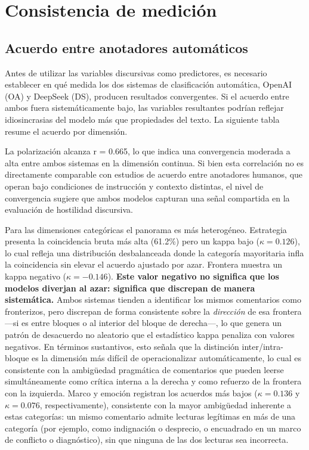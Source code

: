 \documentclass[
  letterpaper,
  numbers=noendperiod,
  fontsize=11pt,
  DIV=12,
  titlepage=false]{scrreprt}
\begin{document}
\section{Consistencia de medición}\label{consistencia-de-mediciuxf3n}

\subsection{Acuerdo entre anotadores
automáticos}\label{acuerdo-entre-anotadores-automuxe1ticos}

Antes de utilizar las variables discursivas como predictores, es
necesario establecer en qué medida los dos sistemas de clasificación
automática, OpenAI (OA) y DeepSeek (DS), producen resultados
convergentes. Si el acuerdo entre ambos fuera sistemáticamente bajo, las
variables resultantes podrían reflejar idiosincrasias del modelo más que
propiedades del texto. La siguiente tabla resume el acuerdo por
dimensión.

La polarización alcanza r = 0.665, lo que indica una convergencia
moderada a alta entre ambos sistemas en la dimensión continua. Si bien
esta correlación no es directamente comparable con estudios de acuerdo
entre anotadores humanos, que operan bajo condiciones de instrucción y
contexto distintas, el nivel de convergencia sugiere que ambos modelos
capturan una señal compartida en la evaluación de hostilidad discursiva.

Para las dimensiones categóricas el panorama es más heterogéneo.
Estrategia presenta la coincidencia bruta más alta (61.2\%) pero un
kappa bajo (\(\kappa = 0.126\)), lo cual refleja una distribución
desbalanceada donde la categoría mayoritaria infla la coincidencia sin
elevar el acuerdo ajustado por azar. Frontera muestra un kappa negativo
(\(\kappa = -0.146\)). \textbf{Este valor negativo no significa que los
modelos diverjan al azar: significa que discrepan de manera
sistemática.} Ambos sistemas tienden a identificar los mismos
comentarios como fronterizos, pero discrepan de forma consistente sobre
la \emph{dirección} de esa frontera ---si es entre bloques o al interior
del bloque de derecha---, lo que genera un patrón de desacuerdo no
aleatorio que el estadístico kappa penaliza con valores negativos. En
términos sustantivos, esto señala que la distinción inter/intra-bloque
es la dimensión más difícil de operacionalizar automáticamente, lo cual
es consistente con la ambigüedad pragmática de comentarios que pueden
leerse simultáneamente como crítica interna a la derecha y como refuerzo
de la frontera con la izquierda. Marco y emoción registran los acuerdos
más bajos (\(\kappa = 0.136\) y \(\kappa = 0.076\), respectivamente),
consistente con la mayor ambigüedad inherente a estas categorías: un
mismo comentario admite lecturas legítimas en más de una categoría (por
ejemplo, como indignación o desprecio, o encuadrado en un marco de
conflicto o diagnóstico), sin que ninguna de las dos lecturas sea
incorrecta.
\end{document}
